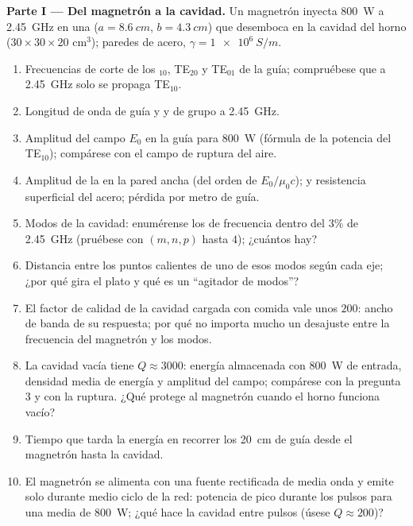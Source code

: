 \begin{problem}
\label{pb:b2:guided-waves:1}

\medskip
\noindent\textbf{Parte I --- Del magnetrón a la cavidad.}
Un magnetrón inyecta \qty{800}{W} a \qty{2.45}{GHz} en una  ($a = \qty{8.6}{cm}$, $b = \qty{4.3}{cm}$) que desemboca en la cavidad
del horno ($30 \times 30 \times 20$ cm$^3$); paredes de acero, $\gamma = \qty{1e6}{S/m}$.
\begin{enumerate}
  \item Frecuencias de corte de los $_{10}$, TE$_{20}$ y TE$_{01}$
        de la guía; compruébese que a \qty{2.45}{GHz} solo se propaga TE$_{10}$.
  \item Longitud de onda de guía y  y de grupo a \qty{2.45}{GHz}.
  \item Amplitud del campo $E_0$ en la guía para \qty{800}{W} (fórmula de la
        potencia del TE$_{10}$); compárese con el campo de ruptura del aire.
  \item Amplitud de la  en la pared ancha (del orden de
        $E_0/\mu_0c$);  y resistencia superficial del acero;
        pérdida por metro de guía.
  \item Modos de la cavidad: enumérense los de frecuencia dentro del $3\%$
        de \qty{2.45}{GHz} (pruébese con $(m, n, p)$ hasta $4$); ¿cuántos hay?
  \item Distancia entre los puntos calientes de uno de esos modos según cada
        eje; ¿por qué gira el plato y qué es un ``agitador de modos''?
  \item El factor de calidad de la cavidad cargada con comida vale unos
        $200$: ancho de banda de su respuesta; por qué no importa mucho un
        desajuste entre la frecuencia del magnetrón y los modos.
  \item La cavidad vacía tiene $Q \approx 3000$: energía almacenada con \qty{800}{W}
        de entrada, densidad media de energía y amplitud del campo; compárese con
        la pregunta 3 y con la ruptura. ¿Qué protege al magnetrón
        cuando el horno funciona vacío?
  \item Tiempo que tarda la energía en recorrer los \qty{20}{cm} de guía desde
        el magnetrón hasta la cavidad.
  \item El magnetrón se alimenta con una fuente rectificada de media onda y emite
        solo durante medio ciclo de la red: potencia de pico durante
        los pulsos para una media de \qty{800}{W}; ¿qué hace la cavidad
        entre pulsos (úsese $Q \approx 200$)?
\end{enumerate}


\end{problem}
